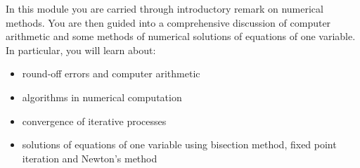 \newtheorem{cor}[subsection]{Corollary}
\newtheorem{pro}[subsection]{Proposition}
\newtheorem{theo}[subsection]{Theorem}
\newtheorem{lem}[subsection]{Lemma}













%


\mddescription
In this module you are carried through introductory remark on numerical methods. You are then guided into a comprehensive discussion of computer arithmetic and some methods of numerical solutions of equations of one variable. In particular, you will learn about:
\begin{itemize}
\item round-off errors and computer arithmetic
\item algorithms in numerical computation 
\item convergence of iterative processes
\item solutions of equations of one variable using bisection method, fixed point iteration and Newton's method
\end{itemize}

